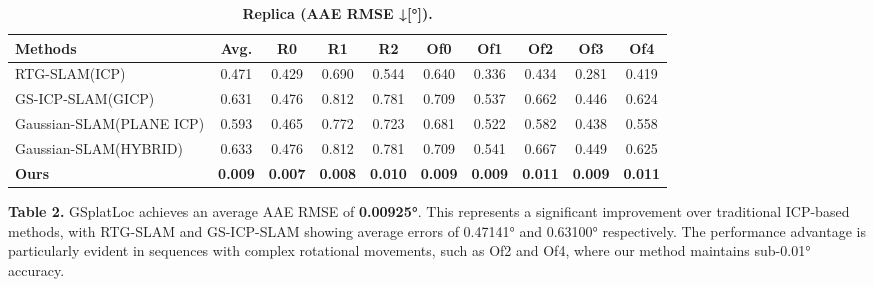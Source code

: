 \documentclass[twocolumn]{article}
\begin{document}
\begin{table}[htbp]
\renewcommand{\thetable}{\textbf{\arabic{table}}}
\renewcommand{\tablename}{\textbf{Table}}
\centering
\caption{\textbf{Replica\cite{straubReplicaDatasetDigital2019} (AAE RMSE ↓[°]).}}
\label{table:_textbf_replica_cite}
\begin{adjustbox}{max width=\columnwidth,max height=!,center}
\begin{tabular}{lccccccccc}
\toprule
\textbf{Methods} & \textbf{Avg.} & \textbf{R0} & \textbf{R1} & \textbf{R2} & \textbf{Of0} & \textbf{Of1} & \textbf{Of2} & \textbf{Of3} & \textbf{Of4}\\
\midrule
RTG-SLAM(ICP)\cite{pengRTGSLAMRealtime3D2024} & \cellcolor{yellow!30}0.471 & \cellcolor{yellow!30}0.429 & \cellcolor{yellow!30}0.690 & \cellcolor{yellow!30}0.544 & \cellcolor{yellow!30}0.640 & \cellcolor{yellow!30}0.336 & \cellcolor{yellow!30}0.434 & \cellcolor{yellow!30}0.281 & \cellcolor{yellow!30}0.419\\
GS-ICP-SLAM(GICP)\cite{haRGBDGSICPSLAM2024} & 0.631 & 0.476 & 0.812 & 0.781 & 0.709 & 0.537 & 0.662 & 0.446 & 0.624\\
Gaussian-SLAM(PLANE ICP)\cite{yugayGaussianSLAMPhotorealisticDense2024} & \cellcolor{lime!50}0.593 & \cellcolor{lime!50}0.465 & \cellcolor{lime!50}0.772 & \cellcolor{lime!50}0.723 & \cellcolor{lime!50}0.681 & \cellcolor{lime!50}0.522 & \cellcolor{lime!50}0.582 & \cellcolor{lime!50}0.438 & \cellcolor{lime!50}0.558\\
Gaussian-SLAM(HYBRID)\cite{yugayGaussianSLAMPhotorealisticDense2024} & 0.633 & 0.476 & 0.812 & 0.781 & 0.709 & 0.541 & 0.667 & 0.449 & 0.625\\
\midrule
\textbf{Ours} & \cellcolor{green!30}\textbf{0.009} & \cellcolor{green!30}\textbf{0.007} & \cellcolor{green!30}\textbf{0.008} & \cellcolor{green!30}\textbf{0.010} & \cellcolor{green!30}\textbf{0.009} & \cellcolor{green!30}\textbf{0.009} & \cellcolor{green!30}\textbf{0.011} & \cellcolor{green!30}\textbf{0.009} & \cellcolor{green!30}\textbf{0.011}\\
\bottomrule
\end{tabular}
\end{adjustbox}
\end{table}

\textbf{Table 2.} GSplatLoc achieves an average AAE RMSE of
\textbf{0.00925°}. This represents a significant improvement over
traditional ICP-based methods, with
RTG-SLAM\autocite{pengRTGSLAMRealtime3D2024} and
GS-ICP-SLAM\autocite{haRGBDGSICPSLAM2024} showing average errors of
0.47141° and 0.63100° respectively. The performance advantage is
particularly evident in sequences with complex rotational movements,
such as Of2 and Of4, where our method maintains sub-0.01° accuracy.
\end{document}
